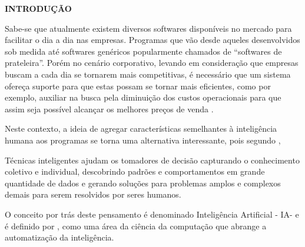 \begin{center}
  \vspace{1.2em}
  \textbf{\large INTRODUÇÃO}
  \vspace{2.9em}
\end{center}
\thispagestyle{empty}




\par Sabe-se   que   atualmente   existem   diversos   softwares  
disponíveis no mercado para facilitar o dia a dia nas empresas.   Programas que  
vão desde aqueles desenvolvidos sob   medida até   softwares   genéricos   popularmente chamados   de   “softwares   de   prateleira”.
Porém   no   cenário   corporativo,   levando   em   consideração que   empresas   buscam
a   cada   dia   se   tornarem   mais   competitivas,   é   necessário   que   um   sistema  
ofereça   suporte   para   que   estas   possam   se tornar   mais   eficientes,
como   por exemplo,   auxiliar   na  busca   pela   diminuição   dos   custos   operacionais   para   que
assim   seja   possível   alcançar   os   melhores  preços de venda
\cite{livro_laudon_sistemas_de_informacoes_gerenciais}.

\par Neste   contexto,   a   ideia   de   agregar   características  
semelhantes  à inteligência   humana   aos programas se torna uma alternativa
interessante, pois segundo
,

\begin{citacao}
Técnicas inteligentes ajudam os tomadores de decisão capturando o
conhecimento coletivo e individual, descobrindo padrões e  comportamentos
em grande quantidade de dados e gerando   soluções para problemas  amplos
e   complexos   demais   para   serem resolvidos por seres humanos.
\end{citacao} 

\par O conceito por trás deste pensamento é denominado Inteligência Artificial -
IA\footnotemark[1] - e é definido por , como
uma área da ciência da computação que abrange a automatização da inteligência.

